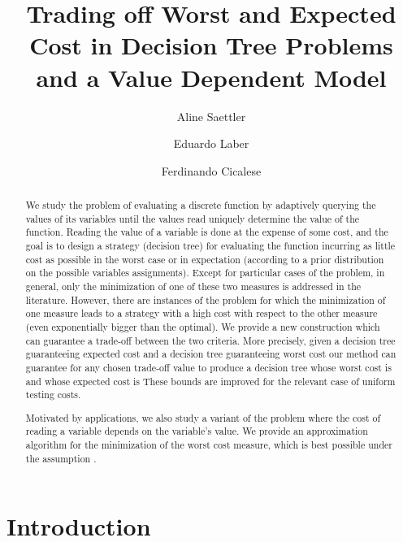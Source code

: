\documentclass{llncs}
\begin{document}
\title{Trading off Worst and Expected Cost in Decision Tree Problems and a Value Dependent Model}
\author{Aline Saettler \and Eduardo Laber  \and Ferdinando Cicalese}
\maketitle


\begin{abstract}
We study the problem of evaluating a discrete function by adaptively querying the values of its variables until the values read uniquely determine the value of the function. Reading the value of a variable is done at the expense of some cost, and the goal is to design a strategy (decision tree) for evaluating the function incurring as little cost as possible in the worst case or in expectation (according to a prior distribution on the possible variables assignments). Except for particular cases of the problem, in general, only the minimization of one of these two measures is addressed in the literature. However, there are instances of the problem for which the minimization of one measure leads to a strategy with a high cost with respect to the other measure (even exponentially bigger than the optimal).  We provide a new construction which can guarantee a trade-off between the two criteria. More precisely, given a decision tree guaranteeing expected cost  and a decision tree guaranteeing worst cost  our method can guarantee for any chosen trade-off value  to produce a decision tree whose worst cost is  and whose expected cost is
 These bounds are improved for the  relevant case of uniform testing costs.

Motivated by applications, we also study a variant of the problem where the cost of reading a variable depends on the variable’s value.
We provide an  approximation algorithm for the minimization of the worst cost measure, which is best possible
under the assumption .
\end{abstract}


\newcommand{\remove}[1]{}



\section{Introduction}
\end{document}
